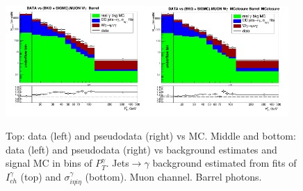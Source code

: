 \begin{figure}[htb]
\begin{center}
   \includegraphics[width=0.48\textwidth]{../figs/figs_v11/MUON_WGamma/PrepareYields/c_DATAvsBkgPlusSigMCc_MUON_WGamma_TEMPL_SIHIH_UNblind__Barrel__phoEt.png}\includegraphics[width=0.48\textwidth]{../figs/figs_v11/MUON_WGamma/PrepareYields/c_DATAvsBkgPlusSigMCc_MUON_WGamma_TEMPL_SIHIH_UNblind_MCclosure__Barrel__phoEt_MCclosure.png}
  \caption{Top: data (left) and pseudodata (right) vs MC. Middle and bottom: data (left) and pseudodata (right) vs background estimates and signal MC in bins of $P_T^{\gamma}$. Jets$\rightarrow\gamma$ background estimated from fits of $I_{ch}^{\gamma}$ (top) and  $\sigma_{i\eta i\eta}^{\gamma}$ (bottom). Muon channel. Barrel photons.}
  \label{fig:DATAvsBKGandSIGMC_MCclosure_MUON_B}
  \end{center}
\end{figure}

